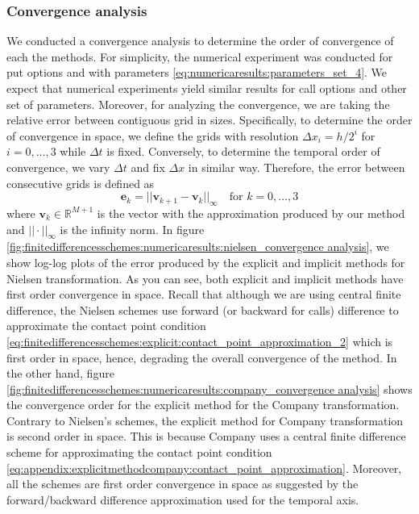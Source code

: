 \subsubsection{Convergence analysis} \label{sec:finitediferencesschemes:numericalresults:convergenceanalysis}

We conducted a convergence analysis to determine the order of convergence of each the methods. For simplicity, the numerical experiment was conducted for put options and with parameters \eqref{eq:numericaresults:parameters_set_4}. We expect that numerical experiments yield similar results for call options and other set of parameters. Moreover, for analyzing the convergence, we are taking the relative error between contiguous grid in sizes. Specifically, to determine the order of convergence in space, we define the grids with resolution $\Delta{x}_i=h/2^i$ for $i=0,\dots,3$ while $\Delta{t}$ is fixed. Conversely, to determine the temporal order of convergence, we vary $\Delta{t}$ and fix $\Delta{x}$ in similar way. Therefore, the error between consecutive grids is defined as
\begin{equation}
  \mathbf{e}_k = ||\mathbf{v}_{k+1} - \mathbf{v}_{k}||_{\infty} \quad \text{for $k=0,\dots,3$}
  \label{eq:finitedifferencesschemes:numericalresults:consecutive_error}
\end{equation}
where $\mathbf{v}_{k}\in\mathbb{R}^{M+1}$ is the vector with the approximation produced by our method and $||\cdot||_{\infty}$ is the infinity norm. In figure \eqref{fig:finitedifferencesschemes:numericaresults:nielsen_convergence analysis}, we show log-log plots of the error produced by the explicit and implicit methods for Nielsen transformation. As you can see, both explicit and implicit methods have first order convergence in space. Recall that although we are using central finite difference, the Nielsen schemes use forward (or backward for calls) difference to approximate the contact point condition \eqref{eq:finitedifferencesschemes:explicit:contact_point_approximation_2} which is first order in space, hence, degrading the overall convergence of the method. In the other hand, figure \eqref{fig:finitedifferencesschemes:numericaresults:company_convergence analysis} shows the convergence order for the explicit method for the Company transformation. Contrary to Nielsen's schemes, the explicit method for Company transformation is second order in space. This is because Company uses a central finite difference scheme for approximating the contact point condition \eqref{eq:appendix:explicitmethodcompany:contact_point_approximation}. Moreover, all the schemes are first order convergence in space as suggested by the forward/backward difference approximation used for the temporal axis.
